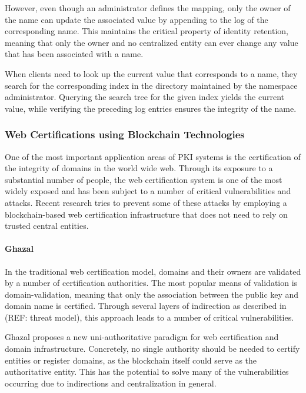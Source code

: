 However, even though an administrator defines the mapping, only the owner of the name can update the associated value by appending to the log of the corresponding name. This maintains the critical property of identity retention, meaning that only the owner and no centralized entity can ever change any value that has been associated with a name.

When clients need to look up the current value that corresponds to a name, they search for the corresponding index in the directory maintained by the namespace administrator. Querying the search tree for the given index yields the current value, while verifying the preceding log entries ensures the integrity of the name.


\subsubsection{Web Certifications using Blockchain Technologies}

One of the most important application areas of PKI systems is the certification of the integrity of domains in the world wide web. Through its exposure to a substantial number of people, the web certification system is one of the most widely exposed and has been subject to a number of critical vulnerabilities and attacks. Recent research tries to prevent some of these attacks by employing a blockchain-based web certification infrastructure that does not need to rely on trusted central entities.

\paragraph{Ghazal}

In the traditional web certification model, domains and their owners are validated by a number of certification authorities. The most popular means of validation is domain-validation, meaning that only the association between the public key and domain name is certified. Through several layers of indirection as described in (REF: threat model), this approach leads to a number of critical vulnerabilities.

Ghazal proposes a new uni-authoritative paradigm for web certification and domain infrastructure. Concretely, no single authority should be needed to certify entities or register domains, as the blockchain itself could serve as the authoritative entity. This has the potential to solve many of the vulnerabilities occurring due to indirections and centralization in general.

